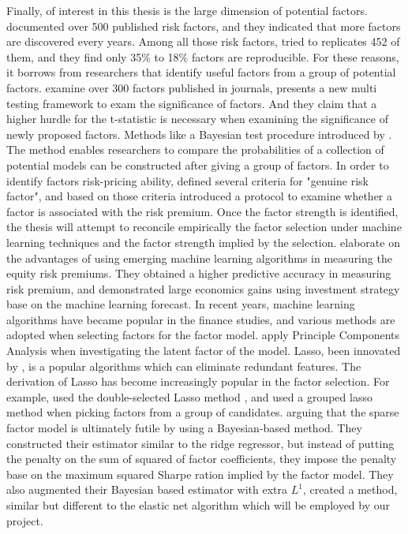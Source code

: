Finally, of interest in this thesis is the large dimension of potential factors.
 documented over 500 published risk factors, and they indicated that more factors are discovered every years.
Among all those risk factors,  tried to replicates 452 of them, and they find only 35\% to 18\% factors are reproducible.
For these reasons, it borrows from researchers that identify useful factors from a group of potential factors.
 examine over 300 factors published in journals, presents a new multi testing framework to exam the significance of factors.
And they claim that a higher hurdle for the t-statistic is necessary when examining the significance of newly proposed factors.
Methods like a Bayesian test procedure introduced by .
The method enables researchers to compare the probabilities of a collection of potential models can be constructed after giving a group of factors.
In order to identify factors risk-pricing ability,  defined several criteria for "genuine risk factor", and based on those criteria introduced a protocol to examine whether a factor is associated with the risk premium.
Once the factor strength is identified, the thesis will attempt to reconcile empirically the factor selection under machine learning techniques and the factor strength implied by the selection.
 elaborate on the advantages of using emerging machine learning algorithms in measuring the equity risk premiums.
They obtained a higher predictive accuracy in measuring risk premium, and demonstrated large economics gains using investment strategy base on the machine learning forecast.
In recent years, machine learning algorithms have became popular in the finance studies, and various methods are adopted when selecting factors for the factor model.
 apply Principle Components Analysis when investigating the latent factor of the model. 
Lasso, been innovated by , is a popular algorithms which can eliminate redundant features. 
The derivation of Lasso has become increasingly popular in the factor selection.
For example,  used the double-selected Lasso method \cite{Belloni2014}, and  used a grouped lasso method \cite{Huang2010} when picking factors from a group of candidates. 
 arguing that the sparse factor model is ultimately futile by using a Bayesian-based method. 
They constructed their estimator similar to the ridge regressor, but instead of putting the penalty on the sum of squared of factor coefficients, they impose the penalty base on the maximum squared Sharpe ration implied by the factor model.
They also augmented their Bayesian based estimator with extra $L^1$, created a method,  similar but different to the elastic net algorithm which will be employed by our project. 
